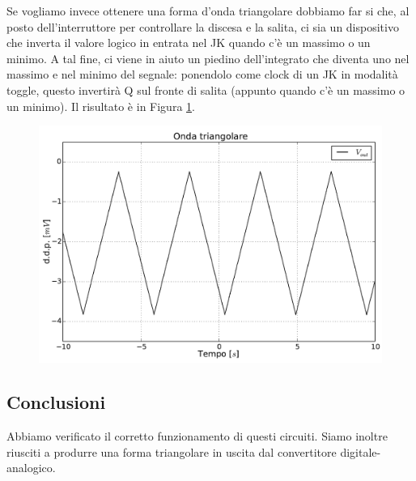 Se vogliamo invece ottenere una forma d'onda triangolare dobbiamo far si che, al posto dell'interruttore per controllare la discesa e la salita, ci sia un dispositivo che inverta il valore logico in entrata nel JK quando c'è un massimo o un minimo. A tal fine, ci viene in aiuto un piedino dell'integrato che diventa uno nel massimo e nel minimo del segnale: ponendolo come clock di un JK in modalità toggle, questo invertirà Q sul fronte di salita (appunto quando c'è un massimo o un minimo). Il risultato è in Figura \ref{fig12:triangolare}.

\begin{figure}[htpc]
\centering
	\includegraphics[width=.65\textwidth]{../E12/latex/triangolare.pdf}
	\caption{}
	\label{fig12:triangolare}
\end{figure}

\subsection*{Conclusioni}

Abbiamo verificato il corretto funzionamento di questi circuiti. Siamo inoltre riusciti a produrre una forma triangolare in uscita dal convertitore digitale-analogico.